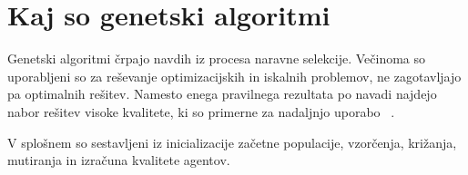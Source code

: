 \documentclass[a4paper,12pt,openright]{book}
\begin{document}
    \section{Kaj so genetski algoritmi}\label{sec:kaj-so-genetski-algoritmi}
    Genetski algoritmi črpajo navdih iz procesa naravne selekcije.
    Večinoma so uporabljeni so za reševanje optimizacijskih in iskalnih problemov, ne zagotavljajo pa optimalnih rešitev.
    Namesto enega pravilnega rezultata po navadi najdejo nabor rešitev visoke kvalitete, ki so primerne za nadaljnjo uporabo
    ~\cite{inteligentni_sistemi_2010,genetic_algorithm_wiki_2022}.
    
    V splošnem so sestavljeni iz inicializacije začetne populacije, vzorčenja, križanja, mutiranja in izračuna kvalitete agentov.
\end{document}
